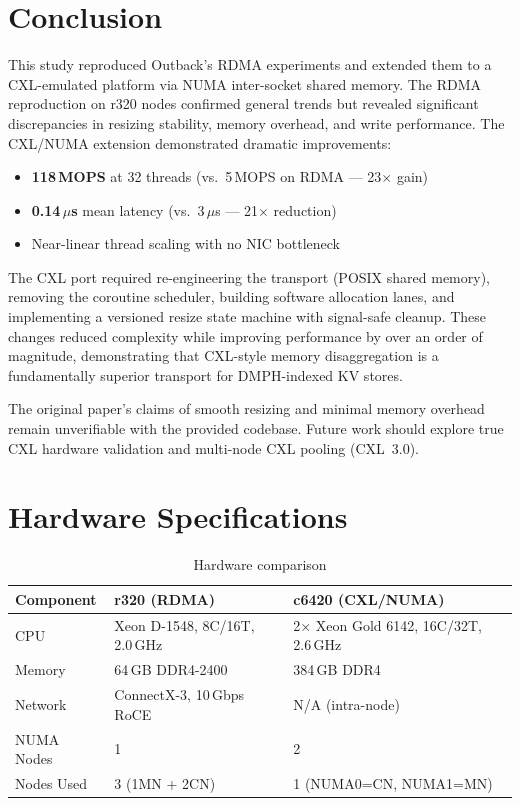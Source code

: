 \documentclass[11pt,a4paper]{article}
\begin{document}
\section{Conclusion}

This study reproduced Outback's RDMA experiments and extended them to a CXL-emulated platform via NUMA inter-socket shared memory. The RDMA reproduction on r320 nodes confirmed general trends but revealed significant discrepancies in resizing stability, memory overhead, and write performance. The CXL/NUMA extension demonstrated dramatic improvements:

\begin{itemize}[nosep]
  \item \textbf{118\,MOPS} at 32 threads (vs.\ 5\,MOPS on RDMA --- 23$\times$ gain)
  \item \textbf{0.14\,$\mu$s} mean latency (vs.\ 3\,$\mu$s --- 21$\times$ reduction)
  \item Near-linear thread scaling with no NIC bottleneck
\end{itemize}

The CXL port required re-engineering the transport (POSIX shared memory), removing the coroutine scheduler, building software allocation lanes, and implementing a versioned resize state machine with signal-safe cleanup. These changes reduced complexity while improving performance by over an order of magnitude, demonstrating that CXL-style memory disaggregation is a fundamentally superior transport for DMPH-indexed KV stores.

The original paper's claims of smooth resizing and minimal memory overhead remain unverifiable with the provided codebase. Future work should explore true CXL hardware validation and multi-node CXL pooling (CXL~3.0).

\appendix
\section{Hardware Specifications}

\begin{table}[H]
\centering
\caption{Hardware comparison}
\label{tab:hw}
\begin{tabular}{@{}lll@{}}
\toprule
\textbf{Component} & \textbf{r320 (RDMA)} & \textbf{c6420 (CXL/NUMA)} \\
\midrule
CPU & Xeon D-1548, 8C/16T, 2.0\,GHz & 2$\times$ Xeon Gold 6142, 16C/32T, 2.6\,GHz \\
Memory & 64\,GB DDR4-2400 & 384\,GB DDR4 \\
Network & ConnectX-3, 10\,Gbps RoCE & N/A (intra-node) \\
NUMA Nodes & 1 & 2 \\
Nodes Used & 3 (1MN + 2CN) & 1 (NUMA0=CN, NUMA1=MN) \\
\bottomrule
\end{tabular}
\end{table}
\end{document}
